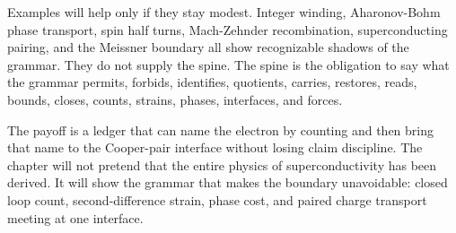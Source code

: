 Examples will help only if they stay modest. Integer winding, Aharonov-Bohm
phase transport, spin half turns, Mach-Zehnder recombination,
superconducting pairing, and the Meissner boundary all show recognizable
shadows of the grammar. They do not supply the spine. The spine is the
obligation to say what the grammar permits, forbids, identifies, quotients,
carries, restores, reads, bounds, closes, counts, strains, phases,
interfaces, and forces.

The payoff is a ledger that can name the electron by counting and then bring
that name to the Cooper-pair interface without losing claim discipline. The
chapter will not pretend that the entire physics of superconductivity has
been derived. It will show the grammar that makes the boundary unavoidable:
closed loop count, second-difference strain, phase cost, and paired charge
transport meeting at one interface.
